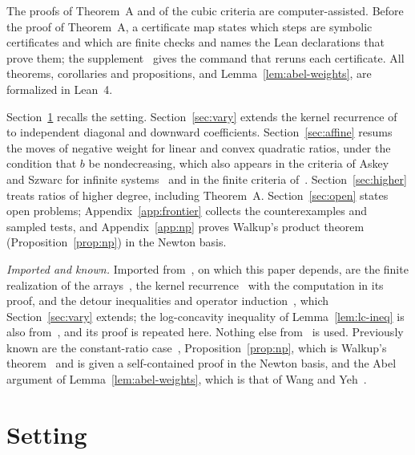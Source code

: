 The proofs of Theorem~A and of the cubic criteria are computer-assisted. Before the proof of Theorem~A, a certificate map states which steps are symbolic certificates and which are finite checks and names the Lean declarations that prove them; the supplement~\cite{supp} gives the command that reruns each certificate. All theorems, corollaries and propositions, and Lemma~\ref{lem:abel-weights}, are formalized in Lean~4.

Section~\ref{sec:setting} recalls the setting. Section~\ref{sec:vary} extends the kernel recurrence of~\cite{P1} to independent diagonal and downward coefficients. Section~\ref{sec:affine} resums the moves of negative weight for linear and convex quadratic ratios, under the condition that $b$ be nondecreasing, which also appears in the criteria of Askey and Szwarc for infinite systems~\cite[Theorems~3.1 and~3.2]{szwarc} and in the finite criteria of~\cite{P3}. Section~\ref{sec:higher} treats ratios of higher degree, including Theorem~A. Section~\ref{sec:open} states open problems; Appendix~\ref{app:frontier} collects the counterexamples and sampled tests, and Appendix~\ref{app:np} proves Walkup's product theorem (Proposition~\ref{prop:np}) in the Newton basis.

\emph{Imported and known.} Imported from~\cite{P1}, on which this paper depends, are the finite realization of the arrays~\cite[Lemma~]{P1}, the kernel recurrence~\cite[Lemma~]{P1} with the computation in its proof, and the detour inequalities and operator induction~\cite[Lemma~ and proof of Theorem~]{P1}, which Section~\ref{sec:vary} extends; the log-concavity inequality of Lemma~\ref{lem:lc-ineq} is also from~\cite{P1}, and its proof is repeated here. Nothing else from~\cite{P1} is used. Previously known are the constant-ratio case~\cite{P1}, Proposition~\ref{prop:np}, which is Walkup's theorem~\cite{walkup} and is given a self-contained proof in the Newton basis, and the Abel argument of Lemma~\ref{lem:abel-weights}, which is that of Wang and Yeh~\cite{wangyeh}.

\section{Setting}\label{sec:setting}

